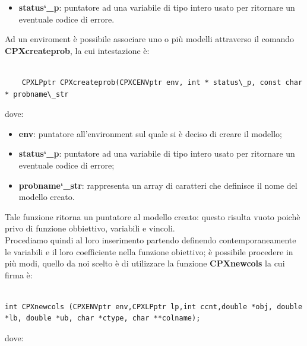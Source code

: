 \documentclass[11pt]{article}
\begin{document}
\begin{itemize}
\item \textbf{status\char`\_p}: puntatore ad una variabile di tipo intero usato per ritornare un eventuale codice di errore.
\end{itemize}


Ad un enviroment è possibile associare uno o più modelli attraverso il comando \textbf{CPXcreateprob}, la cui intestazione è:

\begin{lstlisting}

    CPXLPptr CPXcreateprob(CPXCENVptr env, int * status\_p, const char * probname\_str

\end{lstlisting}


dove:

\begin{itemize}
    \item \textbf{env}: puntatore all'environment sul quale si è deciso di creare il modello;
    \item \textbf{status\char`\_p}: puntatore ad una variabile di tipo intero usato per ritornare un eventuale codice di errore;
    \item \textbf{probname\char`\_str}: rappresenta un array di caratteri che definisce il nome del modello creato.
\end{itemize}

Tale funzione ritorna un puntatore al modello creato: questo risulta vuoto poichè privo di funzione obbiettivo, variabili e vincoli.\\

Procediamo quindi al loro inserimento partendo definendo contemporaneamente le variabili e il loro coefficiente nella funzione obiettivo; è possibile procedere in più modi, quello da noi scelto è di utilizzare la funzione \textbf{CPXnewcols} la cui firma è:


\begin{lstlisting}

int CPXnewcols (CPXENVptr env,CPXLPptr lp,int ccnt,double *obj, double *lb, double *ub, char *ctype, char **colname);

\end{lstlisting}

dove:
\end{document}
